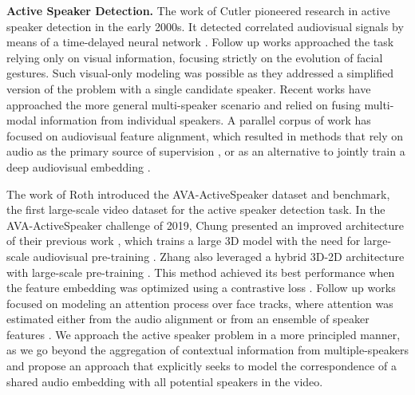\documentclass[10pt,twocolumn,letterpaper]{article}
\begin{document}
\noindent
\textbf{Active Speaker Detection.}
The work of Cutler \etal \cite{cutler2000look} pioneered research in active speaker detection in the early 2000s. It detected correlated audiovisual signals by means of a time-delayed neural network \cite{waibel1989phoneme}. Follow up works \cite{everingham2009taking, saenko2005visualspeech}  approached the task relying only on visual information, focusing strictly on the evolution of facial gestures. Such visual-only modeling was possible as they addressed a simplified version of the problem with a single candidate speaker. Recent works \cite{chakravarty2016active, chung2016out} have approached the more general multi-speaker scenario and relied on fusing multi-modal information from individual speakers. A parallel corpus of work has focused on audiovisual feature alignment, which resulted in methods that rely on audio as the primary source of supervision \cite{chakravarty2015s}, or as an alternative to jointly train a deep audiovisual embedding \cite{chung2018voxceleb2, chung2016out, nagrani2017voxceleb, tao2017bimodal}.


The work of Roth \etal \cite{roth2019ava} introduced the AVA-ActiveSpeaker dataset and benchmark, the first large-scale video dataset for the active speaker detection task. In the AVA-ActiveSpeaker challenge of 2019, Chung \etal \cite{chung2019naver} presented an improved architecture of their previous work \cite{chung2016out}, which trains a large 3D model with the need for large-scale audiovisual pre-training \cite{nagrani2017voxceleb}. Zhang \etal \cite{zhangmulti} also leveraged a hybrid 3D-2D architecture with large-scale pre-training \cite{chung2016out, chung2019perfect}. This method achieved its best performance when the feature embedding was optimized using a contrastive loss \cite{hadsell2006dimensionality}. Follow up works focused on modeling an attention process over face tracks, where attention was estimated either from the audio alignment \cite{afouras2020self} or from an ensemble of speaker features \cite{alcazar2020active}. We approach the active speaker problem in a more principled manner, as we go beyond the aggregation of contextual information from multiple-speakers and propose an approach that explicitly seeks to model the correspondence of a shared audio embedding with all potential speakers in the video.
\end{document}
